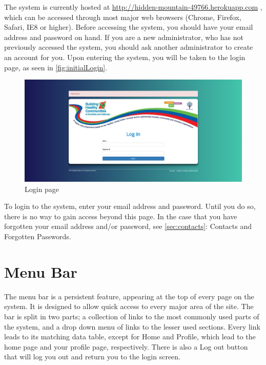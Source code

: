 \documentclass{bhcguides}
\begin{document}
The system is currently hosted at \url{http://hidden-mountain-49766.herokuapp.com} , which can be accessed through most major web browsers (Chrome, Firefox, Safari, IE8 or higher). Before accessing the system, you should have your email address and password on hand. If you are a new administrator, who has not previously accessed the system, you should ask another administrator to create an account for you. Upon entering the system, you will be taken to the login page, as seen in \autoref{fig:initialLogin}.

\begin{figure}[h!]
 \centerline{\includegraphics[width=\textwidth, height=\textheight, keepaspectratio]{loginscreen.png}}
 \caption{Login page}
 \label{fig:initialLogin}
\end{figure}

To login to the system, enter your email address and password. Until you do so, there is no way to gain access beyond this page. In the case that you have forgotten your email address and/or password, see \autoref{sec:contacts}: Contacts and Forgotten Passwords.

\pagebreak

\section{Menu Bar}
\label{sec:menubar}

The menu bar is a persistent feature, appearing at the top of every page on the system. It is designed to allow quick access to every major area of the site. The bar is split in two parts; a collection of links to the most commonly used parts of the system, and a drop down menu of links to the lesser used sections. Every link leads to its matching data table, except for Home and Profile, which lead to the home page and your profile page, respectively. There is also a Log out button that will log you out and return you to the login screen.
\end{document}
